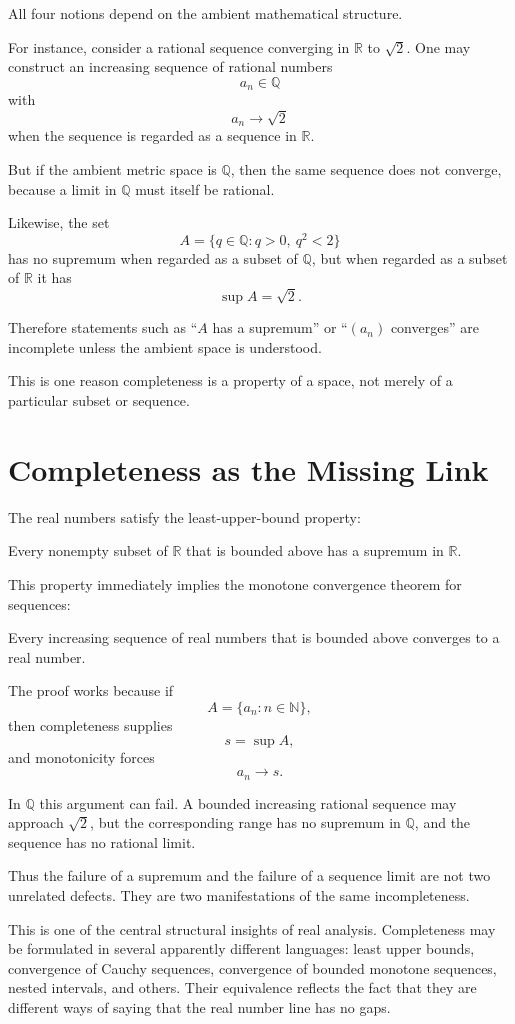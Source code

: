 \documentclass{essay}
\begin{document}
All four notions depend on the ambient mathematical structure.

For instance, consider a rational sequence converging in $\mathbb{R}$ to $\sqrt2$. One may construct an increasing sequence of rational numbers
\[
    a_n\in\mathbb{Q}
\]
with
\[
    a_n\to\sqrt2
\]
when the sequence is regarded as a sequence in $\mathbb{R}$.

But if the ambient metric space is $\mathbb{Q}$, then the same sequence does not converge, because a limit in $\mathbb{Q}$ must itself be rational.

Likewise, the set
\[
    A=\{q\in\mathbb{Q}:q>0,\ q^2<2\}
\]
has no supremum when regarded as a subset of $\mathbb{Q}$, but when regarded as a subset of $\mathbb{R}$ it has
\[
    \sup A=\sqrt2.
\]

Therefore statements such as ``$A$ has a supremum'' or ``$(a_n)$ converges'' are incomplete unless the ambient space is understood.

This is one reason completeness is a property of a space, not merely of a particular subset or sequence.

\section{Completeness as the Missing Link}

The real numbers satisfy the least-upper-bound property:

\medskip
\noindent
Every nonempty subset of $\mathbb{R}$ that is bounded above has a supremum in $\mathbb{R}$.
\medskip

This property immediately implies the monotone convergence theorem for sequences:

\medskip
\noindent
Every increasing sequence of real numbers that is bounded above converges to a real number.
\medskip

The proof works because if
\[
    A=\{a_n:n\in\mathbb{N}\},
\]
then completeness supplies
\[
    s=\sup A,
\]
and monotonicity forces
\[
    a_n\to s.
\]

In $\mathbb{Q}$ this argument can fail. A bounded increasing rational sequence may approach $\sqrt2$, but the corresponding range has no supremum in $\mathbb{Q}$, and the sequence has no rational limit.

Thus the failure of a supremum and the failure of a sequence limit are not two unrelated defects. They are two manifestations of the same incompleteness.

This is one of the central structural insights of real analysis. Completeness may be formulated in several apparently different languages: least upper bounds, convergence of Cauchy sequences, convergence of bounded monotone sequences, nested intervals, and others. Their equivalence reflects the fact that they are different ways of saying that the real number line has no gaps.
\end{document}

